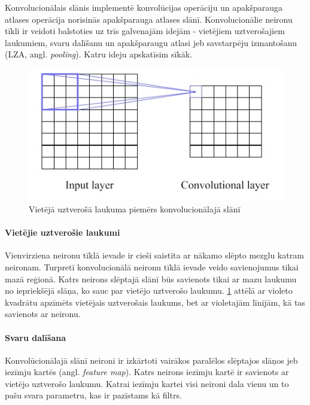 \documentclass[12pt,paper=a4]{report}
\begin{document}
Konvolucionālais slānis implementē konvolūcijas operāciju un apakšparauga atlases operācija norisinās apakšparauga atlases slānī. Konvolucionālie neironu tīkli ir veidoti balstoties uz trīs galvenajām idejām - vietējiem uztverošajiem laukumiem, svaru dalīšanu un apakšparaugu atlasi jeb savstarpēju izmantošanu (LZA, angl. \textit{pooling}). Katru ideju apskatīsim sīkāk. \cite{convolutionalNN}\par
\begin{figure}[h!]
\centering
\includegraphics[width=.6\linewidth]{localReceptiveField}
\caption{Vietējā uztverošā laukuma piemērs konvolucionālajā slānī \cite{convolutionalNN}}
\label{fig:localReceptiveField1}
\end{figure}
\paragraph{Vietējie uztverošie laukumi}Vienvirziena neironu tīklā ievade ir cieši saistīta ar nākamo slēpto mezglu katram neironam. Turpretī konvolucionālā neironu tīklā ievade veido savienojumus tikai mazā reģionā. Katrs neirons slēptajā slānī būs savienots tikai ar mazu laukumu no iepriekšējā slāņa, ko sauc par vietējo uztverošo laukumu. \ref{fig:localReceptiveField1} attēlā ar violeto kvadrātu apzīmēts vietējais uztverošais laukums, bet ar violetajām līnijām, kā tas savienots ar neironu. \cite{convolutionalNN}
\paragraph{Svaru dalīšana} Konvolūcionālajā slānī neironi ir izkārtoti vairākos paralēlos slēptajos slāņos jeb iezīmju kartēs (angl. \textit{feature map}). Katrs neirons iezīmju kartē ir savienots ar vietējo uztverošo laukumu. Katrai iezīmju kartei visi neironi dala vienu un to pašu svara parametru, kas ir pazīstams kā filtrs.\cite{convolutionalNN}
\end{document}
